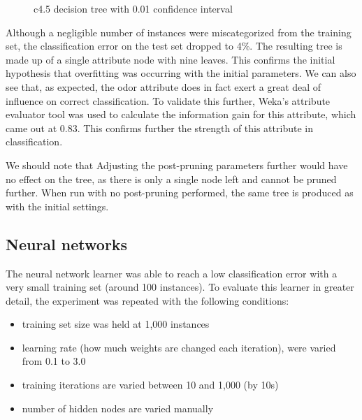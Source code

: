 \documentclass{sig-alternate}
\begin{document}
\begin{figure}[!htbp]
    \centering
    \theverbbox
    \caption{c4.5 decision tree with 0.01 confidence interval \label{dt-c001}}
\end{figure}

Although a negligible number of instances were miscategorized from the training set, the classification error on the test set dropped to 4\%. The resulting tree is made up of a single attribute node with nine leaves. This confirms the initial hypothesis that overfitting was occurring with the initial parameters. We can also see that, as expected, the odor attribute does in fact exert a great deal of influence on correct classification. To validate this further, Weka's attribute evaluator tool was used to calculate the information gain for this attribute, which came out at 0.83. This confirms further the strength of this attribute in classification.

We should note that Adjusting the post-pruning parameters further would have no effect on the tree, as there is only a single node left and cannot be pruned further. When run with no post-pruning performed, the same tree is produced as with the initial settings.



\subsection{Neural networks}

The neural network learner was able to reach a low classification error with a very small training set (around 100 instances). To evaluate this learner in greater detail, the experiment was repeated with the following conditions:

\begin{itemize}
    \item training set size was held at 1,000 instances
    \item learning rate (how much weights are changed each iteration), were varied from 0.1 to 3.0
    \item training iterations are varied between 10 and 1,000 (by 10s)
    \item number of hidden nodes are varied manually
\end{itemize}
\end{document}
